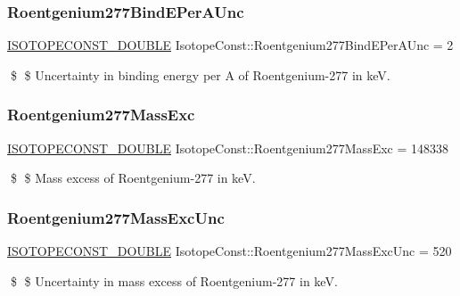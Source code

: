 \subsubsection{\texorpdfstring{Roentgenium277\+Bind\+E\+Per\+A\+Unc}{Roentgenium277BindEPerAUnc}}
{\footnotesize\ttfamily \mbox{\hyperlink{group___isotope_const-_macros_ga8f45a7272ce02c0b4c65c44636ed719a}{I\+S\+O\+T\+O\+P\+E\+C\+O\+N\+S\+T\+\_\+\+D\+O\+U\+B\+LE}} Isotope\+Const\+::\+Roentgenium277\+Bind\+E\+Per\+A\+Unc = 2}

\$ \$ Uncertainty in binding energy per A of Roentgenium-\/277 in keV. \mbox{\label{group___isotope_const-_roentgenium-_rg277_gaf51210c0df57066ad68005562178900c}} 
\subsubsection{\texorpdfstring{Roentgenium277\+Mass\+Exc}{Roentgenium277MassExc}}
{\footnotesize\ttfamily \mbox{\hyperlink{group___isotope_const-_macros_ga8f45a7272ce02c0b4c65c44636ed719a}{I\+S\+O\+T\+O\+P\+E\+C\+O\+N\+S\+T\+\_\+\+D\+O\+U\+B\+LE}} Isotope\+Const\+::\+Roentgenium277\+Mass\+Exc = 148338}

\$ \$ Mass excess of Roentgenium-\/277 in keV. \mbox{\label{group___isotope_const-_roentgenium-_rg277_gaa77a6ccb0b977bdf16807faf0706dc40}} 
\subsubsection{\texorpdfstring{Roentgenium277\+Mass\+Exc\+Unc}{Roentgenium277MassExcUnc}}
{\footnotesize\ttfamily \mbox{\hyperlink{group___isotope_const-_macros_ga8f45a7272ce02c0b4c65c44636ed719a}{I\+S\+O\+T\+O\+P\+E\+C\+O\+N\+S\+T\+\_\+\+D\+O\+U\+B\+LE}} Isotope\+Const\+::\+Roentgenium277\+Mass\+Exc\+Unc = 520}

\$ \$ Uncertainty in mass excess of Roentgenium-\/277 in keV. \mbox{\label{group___isotope_const-_roentgenium-_rg277_gaa5d1c76f86c0a4917a4c993bed3d7424}} 
